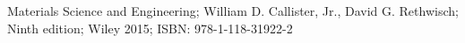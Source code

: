 \begin{thebibliography}{0}
    Materials Science and Engineering; William D. Callister, Jr., David G. Rethwisch; Ninth edition; Wiley 2015; ISBN: 978-1-118-31922-2
\end{thebibliography}